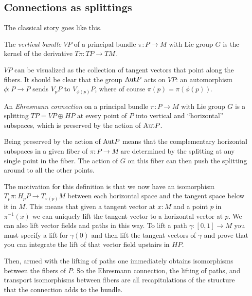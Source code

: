 \documentclass[12pt]{article}
\begin{document}
\subsection{Connections as splittings}

The classical story goes like this.

\begin{mydef}
The \emph{vertical bundle} \( VP \) of a principal bundle \( \pi:P\to M \) with Lie group \( G \) is the kernel of the derivative \( T\pi:TP\to TM \). 
\end{mydef}

\( VP \) can be visualized as the collection of tangent vectors that point along the fibers. It should be clear that the group \( \mathrm{Aut} P \) acts on \( VP \): an automorphism \( \phi:P\to P \) sends \( V_pP \) to \( V_{\phi(p)}P \), where of course \( \pi(p)=\pi(\phi(p)) \).

\begin{mydef}
An \emph{Ehresmann connection} on a principal bundle \( \pi:P\to M \) with Lie group \( G \) is a splitting \( TP=VP\oplus HP \) at every point of \( P \) into vertical and ``horizontal'' subspaces, which is preserved by the action of \( \mathrm{Aut} P \).
\end{mydef}

Being preserved by the action of \( \mathrm{Aut} P \) means that the complementary horizontal subspaces in a given fiber of \( \pi:P\to M \) are determined by the splitting at any single point in the fiber. The action of \( G \) on this fiber can then push the splitting around to all the other points.

The motivation for this definition is that we now have an isomorphism \( T_p\pi:H_pP\to T_{\pi(p)}M \) between each horizontal space and the tangent space below it in \( M \). This means that given a tangent vector at \( x:M \) and a point \( p \) in \( \pi^{-1}(x) \) we can uniquely lift the tangent vector to a horizontal vector at \( p \). We can also lift vector fields and paths in this way. To lift a path \( \gamma:[0,1]\to M \) you must specify a lift for \( \gamma(0) \) and then lift the tangent vectors of \( \gamma \) and prove that you can integrate the lift of that vector field upstairs in \( HP \).

Then, armed with the lifting of paths one immediately obtains isomorphisms between the fibers of \( P \). So the Ehresmann connection, the lifting of paths, and transport isomorphisms between fibers are all recapitulations of the structure that the connection adds to the bundle.
\end{document}
